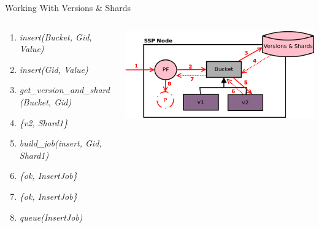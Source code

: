 \documentclass[aspectratio=169]{beamer}
\begin{document}
\begin{frame}{Working With Versions \& Shards}
    \begin{columns}
        \begin{column}[c]{0.5\textwidth}
            \begin{enumerate}
                \item \emph{insert(Bucket, Gid, Value)}
                \item \emph{insert(Gid, Value)}
                \item \emph{get\_version\_and\_shard(Bucket, Gid)}
                \item \emph{\{v2, Shard1\}}
                \item \emph{build\_job(insert, Gid, Shard1)}
                \item \emph{\{ok, InsertJob\}}
                \item \emph{\{ok, InsertJob\}}
                \item \emph{queue(InsertJob)}
            \end{enumerate}
        \end{column}
        \begin{column}[c]{0.5\textwidth}
            \includegraphics[width=\textwidth]{images/versionsandshards.png}
        \end{column}
    \end{columns}
\end{frame}
\end{document}
